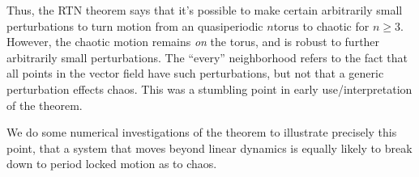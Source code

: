 \documentclass[12pt]{article}
\begin{document}
Thus, the RTN theorem says that it's possible to make certain arbitrarily small
perturbations to turn motion from an quasiperiodic $n$torus to chaotic for $n
\geq 3$. However, the chaotic motion remains \emph{on} the torus, and is robust
to further arbitrarily small perturbations. The ``every'' neighborhood refers to
the fact that all points in the vector field have such perturbations, but not
that a generic perturbation effects chaos. This was a stumbling point in early
use/interpretation of the theorem.

We do some numerical investigations of the theorem to illustrate precisely this
point, that a system that moves beyond linear dynamics is equally likely to
break down to period locked motion as to chaos.
\end{document}
